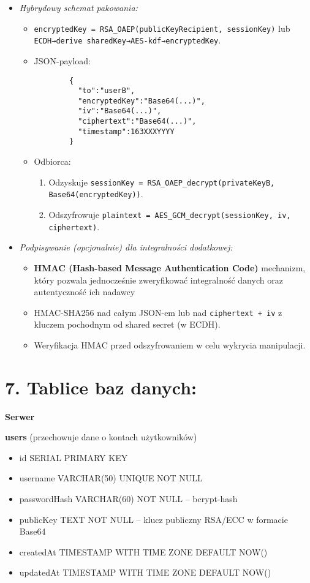 \documentclass[a4paper,12pt]{article}
\begin{document}
\begin{itemize}
\begin{itemize}
        \item \emph{Hybrydowy schemat pakowania:}
        \begin{itemize}
            \item   \texttt{encryptedKey = RSA\_OAEP(publicKeyRecipient, sessionKey)} lub \texttt{ECDH→derive sharedKey→AES-kdf→encryptedKey}.
            \item   JSON-payload:
            \begin{verbatim}
        {
          "to":"userB",
          "encryptedKey":"Base64(...)",
          "iv":"Base64(...)",
          "ciphertext":"Base64(...)",
          "timestamp":163XXXYYYY
        }
            \end{verbatim}
            \item   Odbiorca:
            \begin{enumerate}
                \item   Odzyskuje \texttt{sessionKey = RSA\_OAEP\_decrypt(privateKeyB, Base64(encryptedKey))}.
                \item   Odszyfrowuje \texttt{plaintext = AES\_GCM\_decrypt(sessionKey, iv, ciphertext)}.
            \end{enumerate}
        \end{itemize}
        \item \emph{Podpisywanie (opcjonalnie) dla integralności dodatkowej:}
        \begin{itemize}
            \item \textbf{HMAC (Hash-based Message Authentication Code)} mechanizm, który pozwala jednocześnie zweryfikować integralność danych oraz autentyczność ich nadawcy
            \item HMAC-SHA256 nad całym JSON-em lub nad \texttt{ciphertext + iv} z kluczem pochodnym od shared secret (w ECDH).
            \item Weryfikacja HMAC przed odszyfrowaniem w celu wykrycia manipulacji.
        \end{itemize}
    \end{itemize}
\end{itemize}

\section*{7. Tablice baz danych:}

\textbf{Serwer}

\textbf{users} (przechowuje dane o kontach użytkowników)
\begin{itemize}
    \item id SERIAL PRIMARY KEY
    \item username VARCHAR(50) UNIQUE NOT NULL
    \item passwordHash VARCHAR(60) NOT NULL  – bcrypt-hash
    \item publicKey TEXT NOT NULL  – klucz publiczny RSA/ECC w formacie Base64
    \item createdAt TIMESTAMP WITH TIME ZONE DEFAULT NOW()
    \item updatedAt TIMESTAMP WITH TIME ZONE DEFAULT NOW()
\end{itemize}
\end{document}
